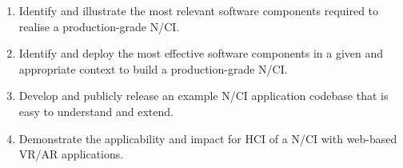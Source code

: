 \begin{enumerate}
  \item Identify and illustrate the most relevant software components required to realise a production-grade N/CI.
  \item Identify and deploy the most effective software components in a given and appropriate context to build a production-grade N/CI.
  \item Develop and publicly release an example N/CI application codebase that is easy to understand and extend.
  \item Demonstrate the applicability and impact for HCI of a N/CI with web-based VR/AR applications.
\end{enumerate}

